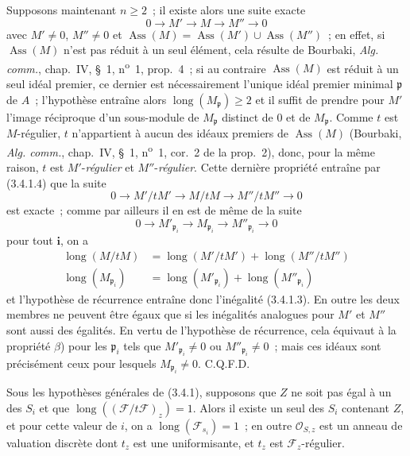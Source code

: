Supposons maintenant $n\geqslant2$~; il existe alors une suite exacte
\[
0\longrightarrow M'\longrightarrow M\longrightarrow M''\longrightarrow0
\]
avec $M'\neq0$, $M''\neq0$ et
$\operatorname{Ass}(M)=\operatorname{Ass}(M')\cup\operatorname{Ass}(M'')$~;
en effet, si $\operatorname{Ass}(M)$ n'est pas réduit à un seul élément, cela
résulte de Bourbaki, \emph{Alg. comm.}, chap.~IV, \S~1,
n\textsuperscript{o}~1, prop.~4~; si au contraire $\operatorname{Ass}(M)$ est
réduit à un seul idéal premier, ce dernier est nécessairement l'unique idéal
premier minimal $\mathfrak p$ de $A$~; l'hypothèse entraîne alors
$\operatorname{long}(M_{\mathfrak p})\geqslant2$ et il suffit de prendre pour
$M'$ l'image réciproque d'un sous-module de $M_{\mathfrak p}$ distinct de $0$
et de $M_{\mathfrak p}$. Comme $t$ est $M$-régulier, $t$ n'appartient à aucun
des idéaux premiers de $\operatorname{Ass}(M)$ (Bourbaki,
\emph{Alg. comm.}, chap.~IV, \S~1, n\textsuperscript{o}~1, cor.~2 de la
prop.~2), donc, pour la même raison, $t$ est $M'$-\emph{régulier} et
$M''$-\emph{régulier}. Cette dernière propriété entraîne par (3.4.1.4) que la suite
\[
0\longrightarrow M'/tM'\longrightarrow M/tM
\longrightarrow M''/tM''\longrightarrow0
\]
est exacte~; comme par ailleurs il en est de même de la suite
\[
0\longrightarrow M'_{\mathfrak p_i}\longrightarrow M_{\mathfrak p_i}
\longrightarrow M''_{\mathfrak p_i}\longrightarrow0
\]
pour tout $\boldsymbol{i}$, on a
\[
\begin{aligned}
\operatorname{long}(M/tM)
&=\operatorname{long}(M'/tM')+\operatorname{long}(M''/tM'')\\
\operatorname{long}(M_{\mathfrak p_i})
&=\operatorname{long}(M'_{\mathfrak p_i})
 +\operatorname{long}(M''_{\mathfrak p_i})
\end{aligned}
\]
et l'hypothèse de récurrence entraîne donc l'inégalité (3.4.1.3). En outre
les deux membres ne peuvent être égaux que si les inégalités analogues pour
$M'$ et $M''$ sont aussi des égalités. En vertu de l'hypothèse de récurrence,
cela équivaut à la propriété $\beta$) pour les $\mathfrak p_i$ tels que
$M'_{\mathfrak p_i}\neq0$ ou $M''_{\mathfrak p_i}\neq0$~; mais ces idéaux sont
précisément ceux pour lesquels $M_{\mathfrak p_i}\neq0$. C.Q.F.D.


\begin{corollary}[3.4.2]
\label{IV.2.3.4.2-fr}
Sous les hypothèses générales de \textup{(3.4.1)}, supposons que $Z$ ne soit pas égal
à un des $S_i$ et que
$\operatorname{long}((\mathcal F/t\mathcal F)_z)=1$. Alors il existe un seul
des $S_i$ contenant $Z$, et pour cette valeur de $i$, on a
$\operatorname{long}(\mathcal F_{s_i})=1$~; en outre
$\mathcal O_{S,z}$ est un anneau de valuation discrète dont $t_z$ est une
uniformisante, et $t_z$ est $\mathcal F_z$-régulier.
\end{corollary}

